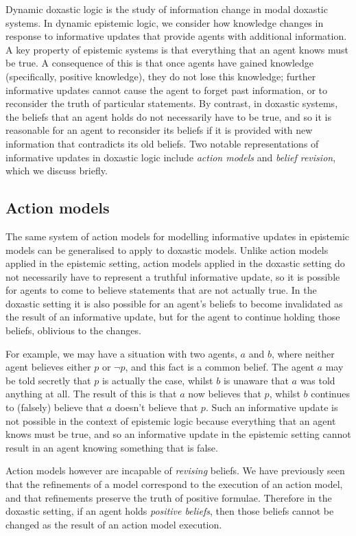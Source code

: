 Dynamic doxastic logic is the study of information change in modal doxastic
systems. In dynamic epistemic logic, we consider how knowledge changes in
response to informative updates that provide agents with additional information.
A key property of epistemic systems is that everything that an agent knows must
be true. A consequence of this is that once agents have gained knowledge
(specifically, positive knowledge), they do not lose this knowledge; further
informative updates cannot cause the agent to forget past information, or to
reconsider the truth of particular statements. By contrast, in doxastic systems,
the beliefs that an agent holds do not necessarily have to be true, and so it is
reasonable for an agent to reconsider its beliefs if it is provided with new
information that contradicts its old beliefs. Two notable representations of
informative updates in doxastic logic include {\em action models} and {\em
belief revision}, which we discuss briefly.

\subsection*{Action models}

The same system of action models for modelling informative updates in epistemic
models can be generalised to apply to doxastic models. Unlike action models
applied in the epistemic setting, action models applied in the doxastic setting
do not necessarily have to represent a truthful informative update, so it is
possible for agents to come to believe statements that are not actually true.
In the doxastic setting it is also possible for an agent's beliefs to become
invalidated as the result of an informative update, but for the agent to
continue holding those beliefs, oblivious to the changes. 

For example, we may have a situation with two agents, $a$ and $b$, where neither
agent believes either $p$ or $\neg p$, and this fact is a common belief. The
agent $a$ may be told secretly that $p$ is actually the case, whilst $b$ is
unaware that $a$ was told anything at all. The result of this is that $a$ now
believes that $p$, whilst $b$ continues to (falsely) believe that $a$ doesn't
believe that $p$. Such an informative update is not possible in the context of
epistemic logic because everything that an agent knows must be true, and so an
informative update in the epistemic setting cannot result in an agent knowing
something that is false.

Action models however are incapable of {\em revising} beliefs. We have
previously seen that the refinements of a model correspond to the execution of
an action model, and that refinements preserve the truth of positive formulae.
Therefore in the doxastic setting, if an agent holds {\em positive beliefs},
then those beliefs cannot be changed as the result of an action model execution.


